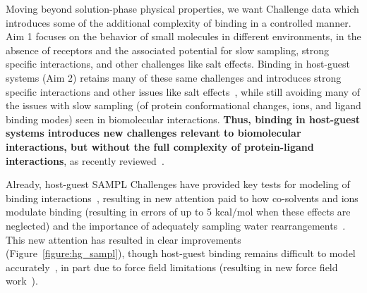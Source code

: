 \documentclass[11pt]{article}
\begin{document}
Moving beyond solution-phase physical properties, we want Challenge data which introduces some of the additional complexity of binding in a controlled manner.  
Aim 1 focuses on the behavior of small molecules in different environments, in the absence of receptors and the associated potential for slow sampling, strong specific interactions, and other challenges like salt effects.
Binding in host-guest systems (Aim 2) retains many of these same challenges and introduces strong specific interactions and other issues like salt effects~\cite{Mobley:2017:AnnualReviewofBiophysics}, while still avoiding many of the issues with slow sampling (of protein conformational changes, ions, and ligand binding modes) seen in biomolecular interactions.
\textbf{Thus, binding in host-guest systems introduces new challenges relevant to biomolecular interactions, but without the full complexity of protein-ligand interactions}, as recently reviewed~\cite{Mobley:2017:AnnualReviewofBiophysics}.

Already, host-guest SAMPL Challenges have provided key tests for modeling of binding interactions~\cite{Mobley:2017:AnnualReviewofBiophysics}, resulting in new attention paid to how co-solvents and ions modulate binding (resulting in errors of up to 5 kcal/mol when these effects are neglected) and the importance of adequately sampling water rearrangements~\cite{muddana_sampl4_2014, Mobley:2017:AnnualReviewofBiophysics, yin_overview_2016, bhakat_resolving_2016}.
This new attention has resulted in clear improvements (Figure~\ref{figure:hg_sampl}), though host-guest binding remains difficult to model accurately~\cite{henriksen_computational_2015}, in part due to force field limitations (resulting in new force field work~\cite{yin_toward_2015}).
\end{document}
